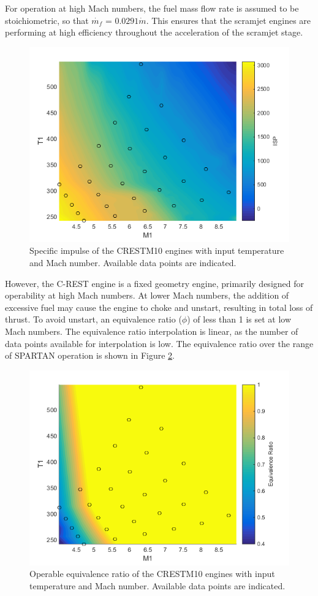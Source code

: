 For operation at high Mach numbers, the fuel mass flow rate is assumed to be stoichiometric, so that $\dot{m_f}$ = $0.0291\dot{m}$. This ensures that the scramjet engines are performing at high efficiency throughout the acceleration of the scramjet stage. 
\begin{figure}[ht]
	\centering
	\includegraphics[width=0.6\linewidth]{figures/3_vehicle_design/ISPinterp}
	\caption{Specific impulse of the CRESTM10 engines with input temperature and Mach number. Available data points are indicated.}
	\label{fig:ISPinterp}
\end{figure}
However, the C-REST engine is a fixed geometry engine, primarily designed for operability at high Mach numbers\cite{Preller2017}. At lower Mach numbers, the addition of excessive fuel may cause the engine to choke and unstart, resulting in total loss of thrust\cite{Preller2017}. To avoid unstart, an equivalence ratio ($\phi$) of less than 1 is set at low Mach numbers. The equivalence ratio interpolation is linear, as the number of data points available for interpolation is low. The equivalence ratio over the range of SPARTAN operation is shown in Figure \ref{fig:EquivalenceRatioInterp}.
\begin{figure}[ht]
	\centering
	\includegraphics[width=0.6\linewidth]{figures/3_vehicle_design/EquivalenceRatioInterp}
	\caption{Operable equivalence ratio of the CRESTM10 engines with input temperature and Mach number. Available data points are indicated.}
	\label{fig:EquivalenceRatioInterp}
\end{figure}
